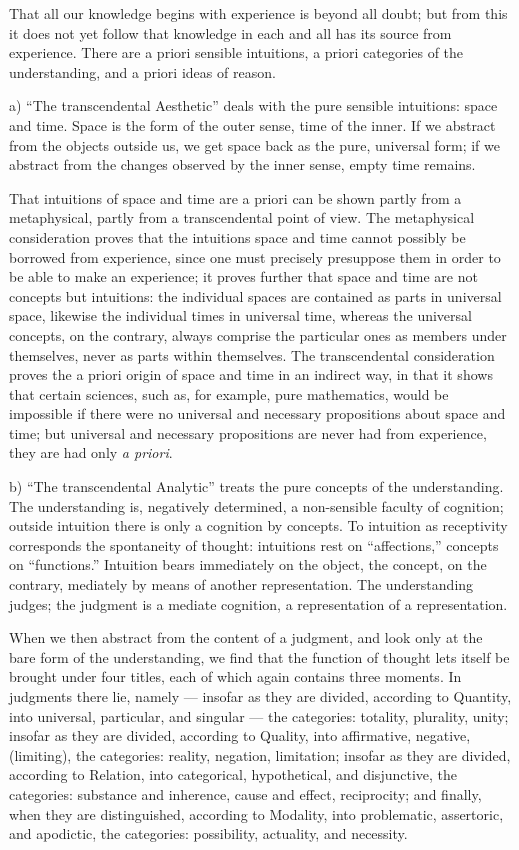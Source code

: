 \documentclass[12pt]{book}
\begin{document}
That all our knowledge begins with experience is beyond all doubt; but from this
it does not yet follow that knowledge in each and all has its source from
experience. There are a priori sensible intuitions, a priori categories of the
understanding, and a priori ideas of reason.

a) ``The transcendental Aesthetic'' deals with the pure sensible intuitions:
space and time. Space is the form of the outer sense, time of the inner. If we
abstract from the objects outside us, we get space back as the pure, universal
form; if we abstract from the changes observed by the inner sense, empty time
remains.

That intuitions of space and time are a priori can be shown partly from a
metaphysical, partly from a transcendental point of view. The metaphysical
consideration proves that the intuitions space and time cannot possibly be
borrowed from experience, since one must precisely presuppose them in order to be
able to make an experience; it proves further that space and time are not
concepts but intuitions: the individual spaces are contained as parts in universal
space, likewise the individual times in universal time, whereas the universal
concepts, on the contrary, always comprise the particular ones as members under
themselves, never as parts within themselves. The transcendental consideration
proves the a priori origin of space and time in an indirect way, in that it shows
that certain sciences, such as, for example, pure mathematics, would be impossible
if there were no universal and necessary propositions about space and time; but
universal and necessary propositions are never had from experience, they are had
only \textit{a priori}.

b) ``The transcendental Analytic'' treats the pure concepts of the understanding.
The understanding is, negatively determined, a non-sensible faculty of cognition;
outside intuition there is only a cognition by concepts. To intuition as
receptivity
corresponds the spontaneity of thought: intuitions rest on ``affections,''
concepts on ``functions.'' Intuition bears immediately on the object, the concept,
on the contrary, mediately by means of another representation. The understanding
judges; the judgment is a mediate cognition, a representation of a representation.

When we then abstract from the content of a judgment, and look only at the bare
form of the understanding, we find that the function of thought lets itself be
brought under four titles, each of which again contains three moments. In
judgments there lie, namely --- insofar as they are divided, according to
Quantity, into universal, particular, and singular --- the categories: totality,
plurality, unity; insofar as they are divided, according to Quality, into
affirmative, negative, (limiting), the categories: reality, negation, limitation;
insofar as they are divided, according to Relation, into categorical, hypothetical,
and disjunctive, the categories: substance and inherence, cause and effect,
reciprocity; and finally, when they are distinguished, according to Modality, into
problematic, assertoric, and apodictic, the categories: possibility, actuality,
and necessity.
\end{document}
